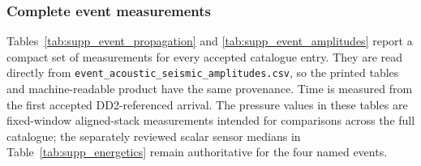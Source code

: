 \documentclass[]{seismica}
\begin{document}
\subsubsection*{Complete event measurements}

Tables~\ref{tab:supp_event_propagation} and
\ref{tab:supp_event_amplitudes} report a compact set of measurements for every
accepted catalogue entry. They are read directly from
\texttt{event\_acoustic\_seismic\_amplitudes.csv}, so the printed tables and
machine-readable product have the same provenance. Time is measured from the
first accepted DD2-referenced arrival. The pressure values in these tables are
fixed-window aligned-stack measurements intended for comparisons across the
full catalogue; the separately reviewed scalar sensor medians in
Table~\ref{tab:supp_energetics} remain authoritative for the four named events.
\end{document}

